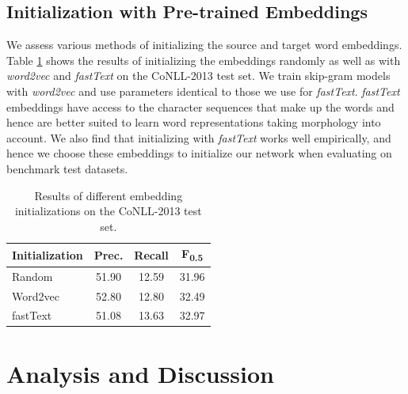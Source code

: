 \documentclass[letterpaper]{article} %
\begin{document}
\vspace{-0.80mm}
\vspace{-1.55mm}
\subsection{Initialization with Pre-trained Embeddings}

We assess various methods of initializing the source and target word embeddings. Table \ref{tbl:embeddings} shows the results of initializing the embeddings randomly as well as with \textit{word2vec} and \textit{fastText} on the CoNLL-2013 test set. We train skip-gram models with \textit{word2vec} and use parameters identical to those we use for \textit{fastText}.   \textit{fastText} embeddings have access to the character sequences that make up the words and hence are better suited to learn word representations taking morphology into account. We also find that initializing with \textit{fastText} works well empirically, and hence we choose these embeddings to initialize our network when evaluating on benchmark test datasets.

\begin{table}[t]
\centering
\small
\begin{tabular}{|l|c|c|c|}
\hline
Initialization  &	 Prec. & 	Recall & 	F\textsubscript{0.5} 	\\
\hline
Random 			&	51.90	&	12.59	& 31.96		\\
Word2vec 		&	52.80	&	12.80	& 32.49	\\
\hline
fastText 		&	51.08   &   13.63   & 32.97   	\\
\hline
\end{tabular}
\caption{Results of different embedding initializations on the CoNLL-2013 test set.}
\label{tbl:embeddings}
\end{table}

\vspace{-0.92mm}
\vspace{-1.54mm}
\section{Analysis and Discussion}
\end{document}
